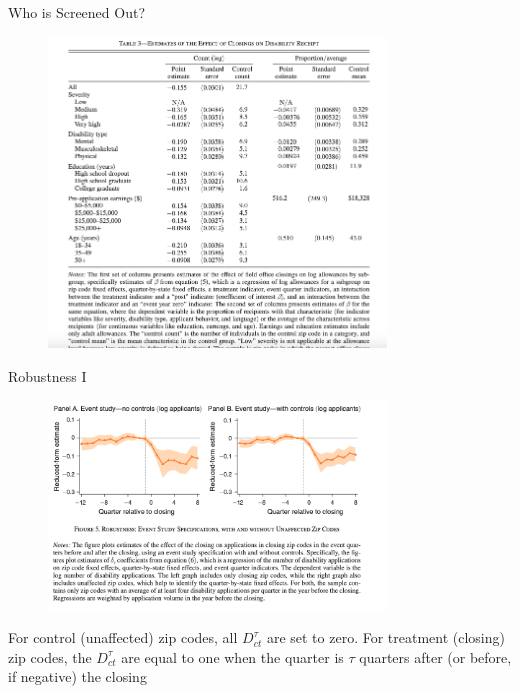 \documentclass{beamer}
\begin{document}
\begin{frame}{Who is Screened Out?}
    \begin{figure}
        \centering
        \includegraphics[width=0.8\textwidth]{T3.png}
    \end{figure}
\end{frame}

\begin{frame}{Robustness I}
    \begin{figure}
        \centering
        \includegraphics[width=0.8\textwidth]{F5.png}
    \end{figure}
    For control (unaffected) zip
    codes, all $ D^\tau_{ct} $
    are set to zero. For treatment (closing) zip codes, the $ D^\tau_{ct} $ are equal to
    one when the quarter is $\tau$ quarters after (or before, if negative) the closing 

\end{frame}
\end{document}
